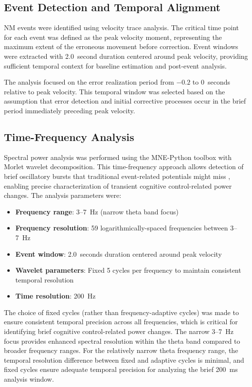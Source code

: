 \documentclass[11pt]{article}
\begin{document}
\subsection{Event Detection and Temporal Alignment}

NM events were identified using velocity trace analysis. The critical time point for each event was defined as the peak velocity moment, representing the maximum extent of the erroneous movement before correction. Event windows were extracted with 2.0~second duration centered around peak velocity, providing sufficient temporal context for baseline estimation and post-event analysis.

The analysis focused on the error realization period from $-0.2$ to $0$~seconds relative to peak velocity. This temporal window was selected based on the assumption that error detection and initial corrective processes occur in the brief period immediately preceding peak velocity.

\subsection{Time-Frequency Analysis}

Spectral power analysis was performed using the MNE-Python toolbox with Morlet wavelet decomposition. This time-frequency approach allows detection of brief oscillatory bursts that traditional event-related potentials might miss \citep{makeig2004mining}, enabling precise characterization of transient cognitive control-related power changes. The analysis parameters were:

\begin{itemize}
\item \textbf{Frequency range}: 3--7~Hz (narrow theta band focus)
\item \textbf{Frequency resolution}: 59 logarithmically-spaced frequencies between 3--7~Hz
\item \textbf{Event window}: 2.0~seconds duration centered around peak velocity
\item \textbf{Wavelet parameters}: Fixed 5 cycles per frequency to maintain consistent temporal resolution 
\item \textbf{Time resolution}: 200~Hz 
\end{itemize}

The choice of fixed cycles (rather than frequency-adaptive cycles) was made to ensure consistent temporal precision across all frequencies, which is critical for identifying brief cognitive control-related power changes. The narrow 3--7~Hz focus provides enhanced spectral resolution within the theta band compared to broader frequency ranges. For the relatively narrow theta frequency range, the temporal resolution difference between fixed and adaptive cycles is minimal, and fixed cycles ensure adequate temporal precision for analyzing the brief 200~ms analysis window.
\end{document}
